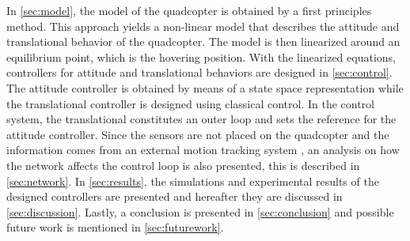 In \autoref{sec:model}, the model of the quadcopter is obtained by a first principles method. This approach yields a non-linear model that describes the attitude and translational behavior of the quadcopter. The model is then linearized around an equilibrium point, which is the hovering position. 
%
With the linearized equations, controllers for attitude and translational behaviors are designed in \autoref{sec:control}. The attitude controller is obtained by means of a state space representation while the translational controller is designed using classical control. In the control system, the translational constitutes an outer loop and sets the reference for the attitude controller.
%
Since the sensors are not placed on the quadcopter and the information comes from an external motion tracking system \cite{vicon}, an analysis on how the network affects the control loop is also presented, this is described in \autoref{sec:network}.
%
In \autoref{sec:results}, the simulations and experimental results of the designed controllers are presented and hereafter they are discussed in \autoref{sec:discussion}. Lastly, a conclusion is presented in \autoref{sec:conclusion} and possible future work is mentioned in \autoref{sec:futurework}. %